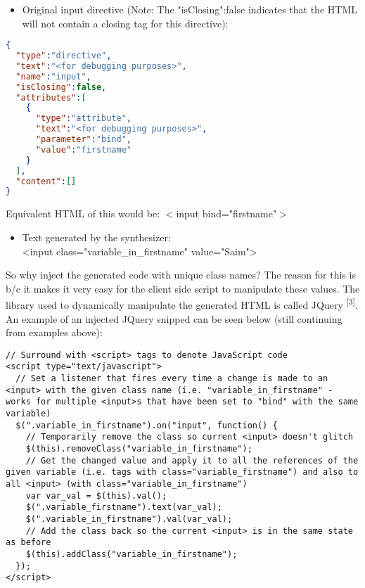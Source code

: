 \documentclass{article}
\begin{document}
\begin{itemize}
    \item Original input directive (Note: The "isClosing":false indicates that the HTML will not contain a closing tag for this directive):
\end{itemize}
\begin{lstlisting}[language=json,firstnumber=1]
{
  "type":"directive",
  "text":"<for debugging purposes>",
  "name":"input",
  "isClosing":false,
  "attributes":[
    {
      "type":"attribute",
      "text":"<for debugging purposes>",
      "parameter":"bind",
      "value":"firstname"
    }
  ],
  "content":[]
}
\end{lstlisting}

Equivalent HTML of this would be: $<$input bind="firstname"$>$

\begin{itemize}
    \item Text generated by the synthesizer: \\<input class="variable\_in\_firstname" value="Saim">
\end{itemize}

So why inject the generated code with unique class names? The reason for this is b/c it makes it very easy for the client side script to manipulate these values. The library used to dynamically manipulate the generated HTML is called JQuery \textsuperscript{[3]}. An example of an injected JQuery snipped can be seen below (still continuing from examples above):

\begin{lstlisting}[caption=Example double binding script]
// Surround with <script> tags to denote JavaScript code
<script type="text/javascript">
  // Set a listener that fires every time a change is made to an <input> with the given class name (i.e. "variable_in_firstname" - works for multiple <input>s that have been set to "bind" with the same variable)
  $(".variable_in_firstname").on("input", function() {
    // Temporarily remove the class so current <input> doesn't glitch
    $(this).removeClass("variable_in_firstname");
    // Get the changed value and apply it to all the references of the given variable (i.e. tags with class="variable_firstname") and also to all <input> (with class="variable_in_firstname")
    var var_val = $(this).val();
    $(".variable_firstname").text(var_val);
    $(".variable_in_firstname").val(var_val);
    // Add the class back so the current <input> is in the same state as before
    $(this).addClass("variable_in_firstname");
  });
</script>
\end{lstlisting}
\end{document}
